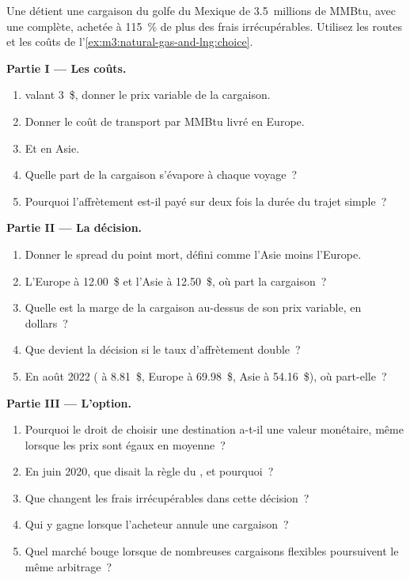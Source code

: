 \begin{problem}\label{pb:m3:natural-gas-and-lng:1}
Une  détient une cargaison du golfe du Mexique de 3.5~millions de MMBtu, avec une
 complète, achetée à 115~\% de  plus des frais irrécupérables. Utilisez les routes et les coûts de
l'\cref{ex:m3:natural-gas-and-lng:choice}.

\medskip\noindent\textbf{Partie I --- Les coûts.}
\begin{enumerate}
\item {} valant 3~\$, donner le prix variable de la cargaison.
\item Donner le coût de transport par MMBtu livré en Europe.
\item Et en Asie.
\item Quelle part de la cargaison s'évapore à chaque voyage~?
\item Pourquoi l'affrètement est-il payé sur deux fois la durée du trajet simple~?
\end{enumerate}

\medskip\noindent\textbf{Partie II --- La décision.}
\begin{enumerate}[resume]
\item Donner le spread du point mort, défini comme l'Asie moins l'Europe.
\item L'Europe à 12.00~\$ et l'Asie à 12.50~\$, où part la cargaison~?
\item Quelle est la marge de la cargaison au-dessus de son prix variable, en dollars~?
\item Que devient la décision si le taux d'affrètement double~?
\item En août 2022 ( à 8.81~\$, Europe à 69.98~\$, Asie à 54.16~\$), où part-elle~?
\end{enumerate}

\medskip\noindent\textbf{Partie III --- L'option.}
\begin{enumerate}[resume]
\item Pourquoi le droit de choisir une destination a-t-il une valeur monétaire, même lorsque les prix sont égaux
en moyenne~?
\item En juin 2020, que disait la règle du , et pourquoi~?
\item Que changent les frais irrécupérables dans cette décision~?
\item Qui y gagne lorsque l'acheteur annule une cargaison~?
\item Quel marché bouge lorsque de nombreuses cargaisons flexibles poursuivent le même arbitrage~?
\end{enumerate}


\end{problem}
